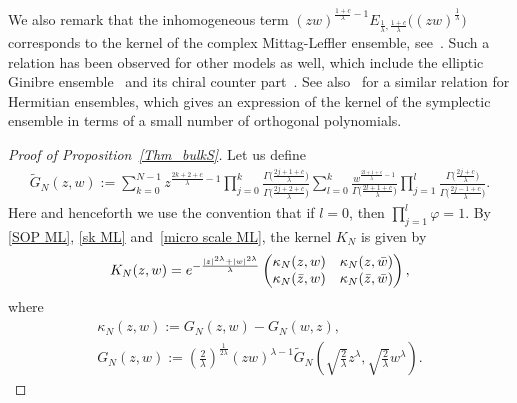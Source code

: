 \documentclass[11pt]{article}
\numberwithin{equation}{section}
\numberwithin{equation}{section}
\newcommand{\1}{\chi}
\begin{document}
We also remark that the inhomogeneous term $(zw)^{ \frac{1+c}{\lambda}-1 } E_{ \frac{1}{\lambda},\frac{1+c}{\lambda} } \big( (zw)^{\frac{1}{\lambda}} \big)$ corresponds to the kernel of the complex Mittag-Leffler ensemble, see~\cite{ameur2018random}.
Such a relation has been observed for other models as well, which include the elliptic Ginibre ensemble~\cite{BE} and its chiral counter part~\cite{MR2180006}.
See also~\cite{MR1762659,MR1675356} for a similar relation for Hermitian ensembles, which gives an expression of the kernel of the symplectic ensemble in terms of a small number of orthogonal polynomials.

\begin{proof}[Proof of Proposition~\ref{Thm_bulkS}]
	Let us define
	\begin{gather*} %
		\widetilde{G}_{N}(z,w):=\sum_{k=0}^{N-1}z^{ \frac{2k+2+c}{\lambda}-1 } \prod_{j=0}^k \frac{ \Gamma\big( \frac{2j+1+c}{\lambda} \big) }{\Gamma\big( \frac{2j+2+c}{\lambda} \big)}
		\sum_{l=0}^{k} \frac{ w^{ \frac{2l+1+c}{\lambda}-1 } }{\Gamma\big( \frac{2l+1+c}{\lambda}\big)} \prod_{j=1}^l \frac{\Gamma\big( \frac{2j+c}{\lambda} \big)}{ \Gamma\big(\frac{2j-1+c}{\lambda}\big) } .
	\end{gather*}
	Here and henceforth we use the convention that if $l=0$, then $\prod_{j=1}^l \varphi=1$.
	By \eqref{SOP ML}, \eqref{sk ML} and~\eqref{micro scale ML}, the kernel $K_N$ is given by
	\begin{gather*}
			K_N(z,w)
			={\rm e}^{ -\frac{ |z|^{2\lambda}+|w|^{2\lambda} }{\lambda} } \begin{pmatrix}
				\kappa_N(z,w) & \kappa_N(z,\bar{w}) \\
				\kappa_N(\bar{z},w) & \kappa_N(\bar{z},\bar{w})
			\end{pmatrix},
		\end{gather*}
	where
	\begin{gather*}
		\kappa_N(z,w):=G_N(z,w)-G_N(w,z), \\ G_N(z,w):=\left( \frac{2}{\lambda} \right)^{\frac{1}{2\lambda}} (zw)^{\lambda-1} \widetilde{G}_N \left( \sqrt{ \frac{2}{\lambda} } z^\lambda, \sqrt{ \frac{2}{\lambda} } w^\lambda \right).
	\end{gather*}
	

\end{proof}
\end{document}
